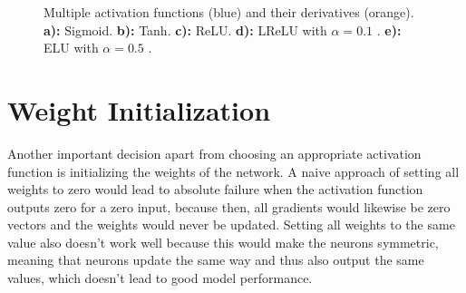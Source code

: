 \begin {figure}[!ht]
	\begin{center}
	\begin {subfigure}[{position=b}]{0.3\linewidth}
		\scalebox{0.60}{}
		\caption{}
	\end {subfigure}
	\begin {subfigure}[{position=b}]{0.3\linewidth}
		\scalebox{0.60}{}
		\caption{}
	\end {subfigure}
	\end{center}

	\begin {center}
	\begin {subfigure}[{position=b}]{0.3\linewidth}
		\scalebox{0.60}{}
		\caption{}
	\end {subfigure}
	\begin {subfigure}[{position=b}]{0.3\linewidth}
		\scalebox{0.60}{}
		\caption{}
	\end {subfigure}
	\begin {subfigure}[{position=b}]{0.3\linewidth}
		\scalebox{0.60}{}
		\caption{}
	\end {subfigure}
	\end{center}

		\caption[]{Multiple activation functions (blue) and their derivatives (orange). \textbf{a):} Sigmoid. \textbf{b):} Tanh. \textbf{c):} ReLU. \textbf{d):} LReLU with $\alpha = 0.1$ . \textbf{e):} ELU with $\alpha = 0.5$ .}
		\label{fig:activation_functions}

\end {figure}



	\section{Weight Initialization}
\label{sec:weight_init}
Another important decision apart from choosing an appropriate activation function is initializing the weights of the network. A naive approach of setting all weights to zero would lead to absolute failure when the activation function outputs zero for a zero input, because then, all gradients would likewise be zero vectors and the weights would never be updated. Setting all weights to the same value also doesn't work well because this would make the neurons symmetric, meaning that neurons update the same way and thus also output the same values, which doesn't lead to good model performance.

